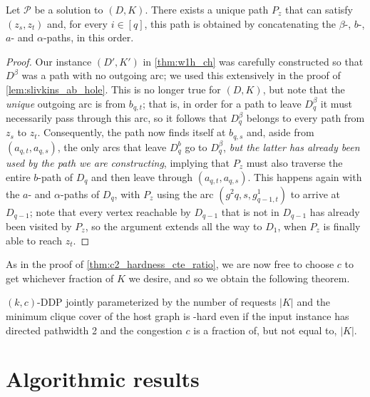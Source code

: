 \documentclass[a4paper,UKenglish,cleveref, autoref, thm-restate]{lipics-v2021}
\newcommand{\pname}[1]{{\sc #1}}
\newcommand{\congestion}{c}
\begin{document}
    \begin{observation}
      Let $\mathcal{P}$ be a solution to $(D,K)$. There exists a unique path $P_z$ that
      can satisfy $(z_s, z_t)$ and, for every $i \in [q]$, this path is obtained by
      concatenating the $\beta$-, $b$-, $a$- and $\alpha$-paths, in this order.
    \end{observation}

    \begin{proof}
      Our instance $(D', K')$ in \autoref{thm:w1h_ch} was carefully constructed so
      that $D^\beta$ was a path with no outgoing arc; we used this extensively in the
      proof of \autoref{lem:slivkins_ab_hole}.
      This is no longer true for $(D, K)$, but note that the \textit{unique} outgoing arc is from
      $b_{q,t}$; that is, in order for a path to leave $D^\beta_q$ it must necessarily pass
      through this arc, so it follows that $D^\beta_q$ belongs to every path from $z_s$ to $z_t$.
      Consequently, the path now finds itself at $b_{q,s}$ and, aside from $(a_{q, t},
      a_{q,s})$, the only arcs that leave $D^b_q$ go to $D^\beta_q$, \textit{but the
      latter has already been used by the path we are constructing}, implying that $P_z$
      must also traverse the entire $b$-path of $D_q$ and then leave through $(a_{q, t}, a_{q,s})$.
      This happens again with the $a$- and $\alpha$-paths of $D_q$, with $P_z$ using the
      arc $(g^2{q,s}, g^1_{q-1, t})$ to arrive at $D_{q-1}$; note that every vertex
      reachable by $D_{q-1}$ that is not in $D_{q-1}$ has already been visited by $P_z$,
      so the argument extends all the way to $D_1$, when $P_z$ is finally able to reach $z_t$.
    \end{proof}

    As in the proof of \autoref{thm:c2_hardness_cte_ratio}, we are now free to choose
    $\congestion$ to get whichever fraction of $K$ we desire, and so we obtain the
    following theorem.

    \begin{theorem}
      \label{thm:w1h_congestion}
      \pname{$(k,c)$-DDP} jointly parameterized by the number of requests
      $|K|$ and the minimum clique cover of the host graph is \W[1]-hard even if the input instance has directed pathwidth 2 and the congestion $\congestion$ is a fraction of, but not equal to, $|K|$.
    \end{theorem}

  
\section{Algorithmic results}
\label{sec:algo}
\end{document}
